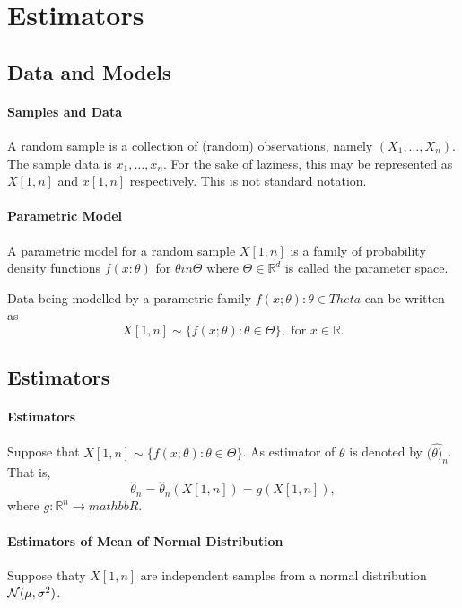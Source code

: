 \section{Estimators}

\subsection{Data and Models}

\paragraph{Samples and Data}
A random sample is a collection of (random) observations, namely
\((X_1, \ldots, X_n)\).
The sample data is \(x_1, \ldots, x_n\).
For the sake of laziness, this may be represented as
\(X[1, n]\) and  \(x[1, n]\) respectively.
This is not standard notation.

\paragraph{Parametric Model}
A parametric model for a random sample \(X[1, n]\)
is a family of probability density functions
\(f(x : \theta)\) for \(\theta in \Theta\) where \(\Theta \in  \mathbb{R}^d\)
is called the parameter space.

Data being modelled by a parametric family \(f(x; \theta): \theta \in  Theta\)
can be written as \[
  X[1, n] \sim \{f(x; \theta) : \theta \in \Theta\}, \text{ for } x \in \mathbb{R}
.\] 

\subsection{Estimators}

\paragraph{Estimators}
Suppose that \(X[1, n] \sim \{f(x; \theta) : \theta \in \Theta\} \).
As estimator of \(\theta\) is denoted by \((\hat{\theta)}_n\).
That is, \[
  \hat{\theta}_n = \hat{\theta}_n(X[1, n]) = g(X[1, n]),
\]  where \(g: \mathbb{R}^n \to mathbb{R}\).

\paragraph{Estimators of Mean of Normal Distribution}
Suppose thaty \(X[1, n]\) are independent samples from a normal distribution
\(\mathcal{N}(\mu, \sigma^2)\).

